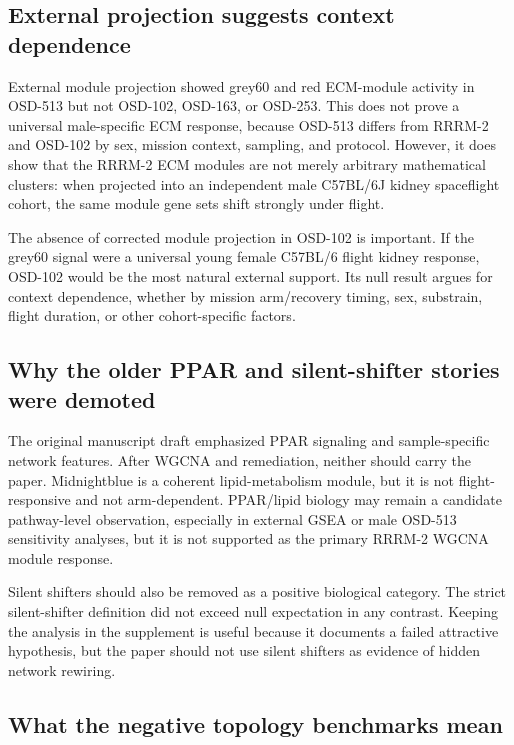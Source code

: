 \documentclass[11pt]{article}
\begin{document}
\subsection{External projection suggests context dependence}

External module projection showed grey60 and red ECM-module activity in OSD-513 but not OSD-102, OSD-163, or OSD-253. This does not prove a universal male-specific ECM response, because OSD-513 differs from RRRM-2 and OSD-102 by sex, mission context, sampling, and protocol. However, it does show that the RRRM-2 ECM modules are not merely arbitrary mathematical clusters: when projected into an independent male C57BL/6J kidney spaceflight cohort, the same module gene sets shift strongly under flight.

The absence of corrected module projection in OSD-102 is important. If the grey60 signal were a universal young female C57BL/6 flight kidney response, OSD-102 would be the most natural external support. Its null result argues for context dependence, whether by mission arm/recovery timing, sex, substrain, flight duration, or other cohort-specific factors.

\subsection{Why the older PPAR and silent-shifter stories were demoted}

The original manuscript draft emphasized PPAR signaling and sample-specific network features. After WGCNA and remediation, neither should carry the paper. Midnightblue is a coherent lipid-metabolism module, but it is not flight-responsive and not arm-dependent. PPAR/lipid biology may remain a candidate pathway-level observation, especially in external GSEA or male OSD-513 sensitivity analyses, but it is not supported as the primary RRRM-2 WGCNA module response.

Silent shifters should also be removed as a positive biological category. The strict silent-shifter definition did not exceed null expectation in any contrast. Keeping the analysis in the supplement is useful because it documents a failed attractive hypothesis, but the paper should not use silent shifters as evidence of hidden network rewiring.

\subsection{What the negative topology benchmarks mean}
\end{document}

